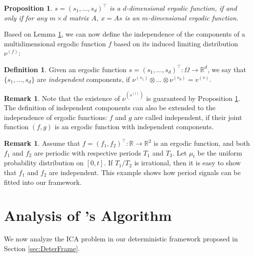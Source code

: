 \documentclass[twoside]{article}
\newcommand{\scom}[1]{s_{#1}}
\newcommand{\real}{\mathbb{R}}
\newtheorem{prop}[lemma]{Proposition}
\theoremstyle{definition}
\newtheorem{definition}[lemma]{Definition}
\newtheorem{remark}[lemma]{Remark}
\begin{document}
\begin{prop}\label{prop:comp}
$s = (\scom{1},\ldots,\scom{d})^{\top}$ is a $d$-dimensional ergodic function, if and only if 
 for any $m\times d$ matrix $A$, $x = A s$ is an $m$-dimensional ergodic function.
\end{prop}  
Based on Lemma \ref{prop:comp}, we can now define the independence of the components of a multidimensional ergodic function $f$ based on its induced limiting distribution $\nu^{(f)}$:
\begin{definition}
Given an ergodic function $s = (\scom{1},\ldots, \scom{d})^{\top}:\Omega \rightarrow \real^d$, 
we say that $\{\scom{1},\ldots, \scom{d}\}$ are \emph{independent} components, 
	if $\nu^{(\scom{1})}\otimes\ldots\otimes\nu^{(\scom{d})} = v^{(s)}$.
\end{definition}
\begin{remark}
Note that the existence of $\nu^{(s^{(i)})}$ is guaranteed by Proposition \ref{prop:comp}. 
The definition of independent components can also be extended to the independence of ergodic functions: 
$f$ and $g$ are called independent, if their joint function $(f,g)$ is an ergodic function with independent components. 
\end{remark}
\begin{remark}
Assume that $f = (f_1,f_2)^{\top}:\real\rightarrow\real^2$ is an ergodic function, and both $f_1$ and $f_2$ are periodic with respective periods $T_1$ and $T_2$. 
Let $\mu_t$ be the uniform probability distribution on $[0,t]$. 
 If $T_1/T_2$ is irrational, then it is easy to show that $f_1$ and $f_2$ are independent. 
 This example shows how period signals can be fitted into our framework.
\end{remark}
\fi

\section{Analysis of \citet{hsu2013learning}'s Algorithm}
\label{sec:AnalysisHK}

We now analyze the ICA problem in our deterministic framework proposed in Section \ref{sec:DeterFrame}.
\end{document}
